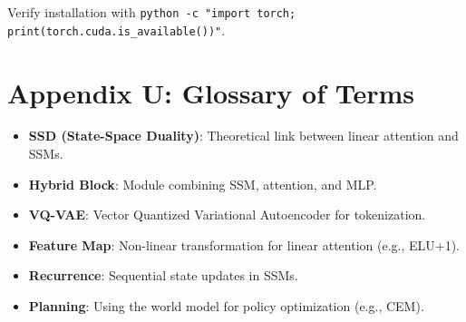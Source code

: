 \documentclass{article}
\begin{document}
Verify installation with \texttt{python -c "import torch; print(torch.cuda.is_available())"}.

\section{Appendix U: Glossary of Terms}
\begin{itemize}
  \item \textbf{SSD (State-Space Duality)}: Theoretical link between linear attention and SSMs.
  \item \textbf{Hybrid Block}: Module combining SSM, attention, and MLP.
  \item \textbf{VQ-VAE}: Vector Quantized Variational Autoencoder for tokenization.
  \item \textbf{Feature Map}: Non-linear transformation for linear attention (e.g., ELU+1).
  \item \textbf{Recurrence}: Sequential state updates in SSMs.
  \item \textbf{Planning}: Using the world model for policy optimization (e.g., CEM).
\end{itemize}
\end{document}
